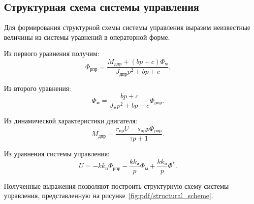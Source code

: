 \subsection{Структурная схема системы управления}

Для формирования структурной схемы системы управления выразим неизвестные величины из системы уравнений в операторной форме.

Из первого уравнения получим:
\begin{equation}
    \Phi_{\text{рпр}}
    =
    \frac{
        M_{\text{дпр}}
        +
        (bp+c)\Phi_{\text{м}}
    }{
        J_{\text{дпр}}p^2+bp+c
    }.
\end{equation}

Из второго уравнения:
\begin{equation}
    \Phi_{\text{м}}
    =
    \frac{
        bp+c
    }{
        J_{\text{м}}p^2+bp+c
    }
    \Phi_{\text{рпр}}.
\end{equation}

Из динамической характеристики двигателя:
\begin{equation}
    M_{\text{дпр}}
    =
    \frac{
        r_{\text{пр}}U
        -
        s_{\text{пр}}p\Phi_{\text{рпр}}
    }{
        \tau p+1
    }.
\end{equation}

Из уравнения системы управления:
\begin{equation}
    U
    =
    -kk_{\text{п}}\Phi_{\text{рпр}}
    -
    \frac{kk_{\text{и}}}{p}\Phi_{\text{м}}
    +
    \frac{kk_{\text{и}}}{p}\Phi^*.
\end{equation}

Полученные выражения позволяют построить структурную схему системы управления, представленную на рисунке~\ref{fig:pdf/structural_scheme}.

